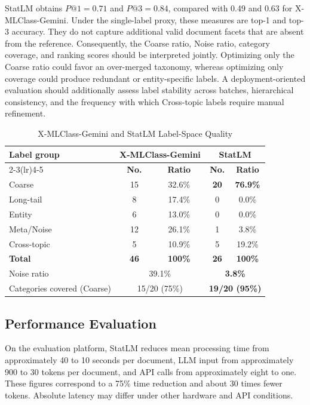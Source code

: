 StatLM obtains $P@1=0.71$ and $P@3=0.84$, compared with 0.49 and 0.63 for X-MLClass-Gemini.
Under the single-label proxy, these measures are top-1 and top-3 accuracy. They do
not capture additional valid document facets that are absent from the reference.
Consequently, the Coarse ratio, Noise ratio, category coverage, and ranking scores
should be interpreted jointly. Optimizing only the Coarse ratio could favor an
over-merged taxonomy, whereas optimizing only coverage could produce redundant or
entity-specific labels. A deployment-oriented evaluation should additionally assess
label stability across batches, hierarchical consistency, and the frequency with
which Cross-topic labels require manual refinement.

\begin{table}[!t]
\renewcommand{\arraystretch}{1.2}
\caption{X-MLClass-Gemini and StatLM Label-Space Quality}
\label{tab:labelspace}
\centering
\footnotesize
\begin{tabular}{@{}lcccc@{}}
\toprule
\multirow{2}{*}{\textbf{Label group}} & \multicolumn{2}{c}{\textbf{X-MLClass-Gemini}} & \multicolumn{2}{c}{\textbf{StatLM}} \\
\cmidrule(lr){2-3}\cmidrule(lr){4-5}
 & \textbf{No.} & \textbf{Ratio} & \textbf{No.} & \textbf{Ratio} \\
\midrule
Coarse      & 15 & 32.6\% & \textbf{20} & \textbf{76.9\%} \\
Long-tail   &  8 & 17.4\% &  0 &  0.0\% \\
Entity      &  6 & 13.0\% &  0 &  0.0\% \\
Meta/Noise  & 12 & 26.1\% &  1 &  3.8\% \\
Cross-topic &  5 & 10.9\% &  5 & 19.2\% \\
\midrule
\textbf{Total} & \textbf{46} & \textbf{100\%} & \textbf{26} & \textbf{100\%} \\
\midrule
Noise ratio                  & \multicolumn{2}{c}{39.1\%} & \multicolumn{2}{c}{\textbf{3.8\%}} \\
Categories covered (Coarse)  & \multicolumn{2}{c}{15/20 (75\%)} & \multicolumn{2}{c}{\textbf{19/20 (95\%)}} \\
\bottomrule
\end{tabular}
\end{table}

\subsection{Performance Evaluation}
On the evaluation platform, StatLM reduces mean processing time from approximately
40 to 10 seconds per document, LLM input from approximately 900 to 30 tokens per document, and API calls from approximately eight to one. These figures correspond to a 75\% time reduction and about 30 times fewer tokens. Absolute latency may differ under other hardware and API conditions.


